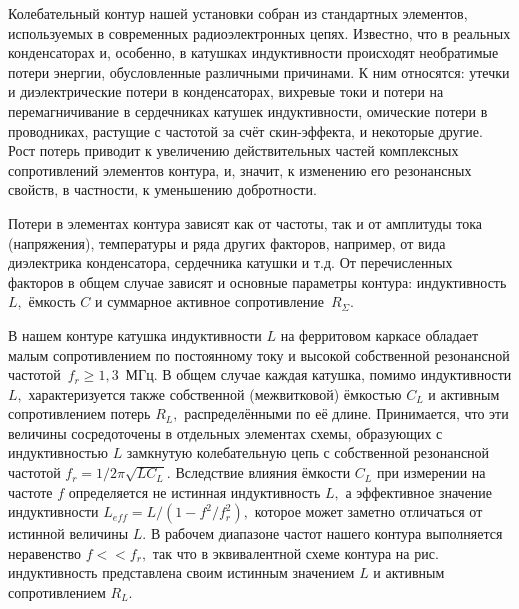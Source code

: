 Колебательный контур нашей установки собран из стандартных элементов,
используемых в современных радиоэлектронных цепях. Известно, что в реальных
конденсаторах и, особенно, в катушках индуктивности происходят необратимые
потери энергии, обусловленные различными причинами. К ним относятся: утечки и
диэлектрические потери в конденсаторах, вихревые токи и потери на
перемагничивание в сердечниках катушек индуктивности, омические потери в
проводниках, растущие с частотой за счёт скин-эффекта, и некоторые другие. Рост
потерь приводит к увеличению действительных частей комплексных сопротивлений
элементов контура, и, значит, к изменению его резонансных свойств, в частности,
к уменьшению добротности.

Потери в элементах контура зависят как от частоты, так и от амплитуды тока
(напряжения), температуры и ряда других факторов, например, от вида диэлектрика
конденсатора, сердечника катушки и т.д. От перечисленных факторов в общем случае
зависят и основные параметры контура: индуктивность $L,$ ёмкость $C$ и суммарное
активное сопротивление~$R_{\Sigma}.$

В нашем контуре катушка индуктивности $L$ на ферритовом каркасе обладает малым
сопротивлением по постоянному току и высокой собственной резонансной
частотой~$f_r\ge1,3$~МГц. В общем случае каждая катушка, помимо индуктивности
$L,$ характеризуется также собственной (межвитковой) ёмкостью $C_L$ и активным
сопротивлением потерь $R_L,$ распределёнными по её длине. Принимается, что эти
величины сосредоточены в отдельных элементах схемы, образующих с индуктивностью
$L$ замкнутую колебательную цепь с собственной резонансной частотой
$f_r=1/2\pi\sqrt{LC_L}.$ Вследствие влияния ёмкости $C_L$ при измерении на
частоте $f$ определяется не истинная индуктивность $L,$ а эффективное значение
индуктивности $L_{eff}=L/(1-f^2/f_r^2),$ которое может заметно отличаться от
истинной величины $L.$ В рабочем диапазоне частот нашего контура выполняется
неравенство $f<<f_r,$ так что в эквивалентной схеме контура на рис.~
индуктивность представлена своим истинным значением $L$ и активным
сопротивлением $R_L.$


